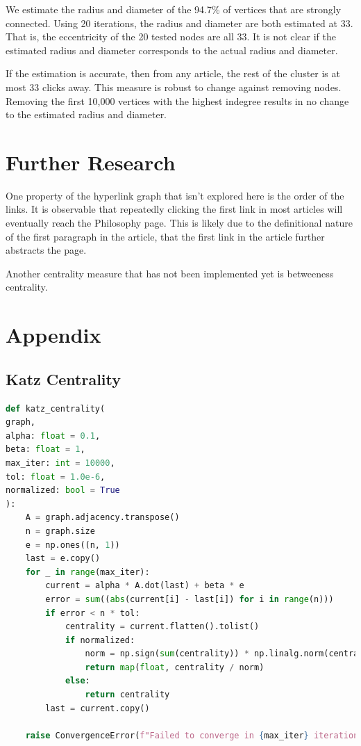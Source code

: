 \documentclass{article}
\begin{document}
We estimate the radius and diameter of the 94.7\% of vertices that are strongly connected.
Using 20 iterations, the radius and diameter are both estimated at 33. That is, the eccentricity of the 20 tested nodes are all 33.
It is not clear if the estimated radius and diameter corresponds to the actual radius and diameter.

If the estimation is accurate, then from any article, the rest of the cluster is at most 33 clicks away.
This measure is robust to change against removing nodes. Removing the first 10,000 vertices with the highest indegree results in no change to the estimated radius and diameter. 


\section{Further Research}

One property of the hyperlink graph that isn't explored here is the order of the links. It is observable that repeatedly clicking the first link in most articles will eventually reach the Philosophy page. This is likely due to the definitional nature of the first paragraph in the article, that the first link in the article further abstracts the page.


Another centrality measure that has not been implemented yet is betweeness centrality.


\section{Appendix}


\subsection*{Katz Centrality}
\linespread{1}
\begin{lstlisting}[language=Python]
def katz_centrality(
graph,
alpha: float = 0.1,
beta: float = 1,
max_iter: int = 10000,
tol: float = 1.0e-6,
normalized: bool = True
):
    A = graph.adjacency.transpose()
    n = graph.size
    e = np.ones((n, 1))
    last = e.copy()
    for _ in range(max_iter):
        current = alpha * A.dot(last) + beta * e
        error = sum((abs(current[i] - last[i]) for i in range(n)))
        if error < n * tol:
            centrality = current.flatten().tolist()
            if normalized:
                norm = np.sign(sum(centrality)) * np.linalg.norm(centrality)
                return map(float, centrality / norm)
            else:
                return centrality
        last = current.copy()

    raise ConvergenceError(f"Failed to converge in {max_iter} iterations.")
\end{lstlisting}
\end{document}
